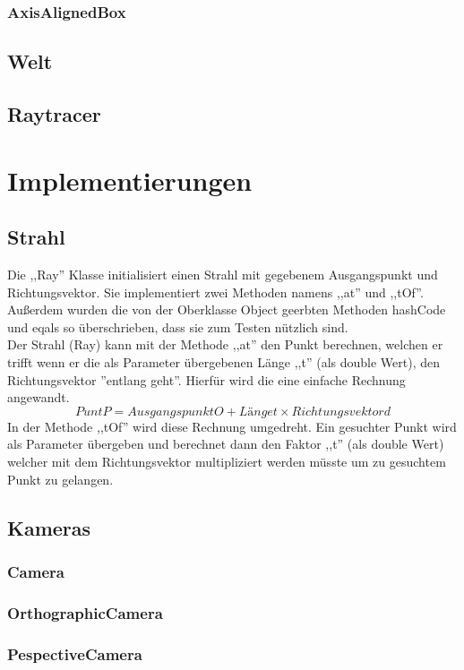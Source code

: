 \documentclass[14pt]{extarticle}
\begin{document}
\subsubsection{AxisAlignedBox}

\subsection{Welt}
\subsection{Raytracer}

\section{Implementierungen}

\subsection{Strahl}
Die ,,Ray'' Klasse initialisiert einen Strahl mit gegebenem Ausgangspunkt und Richtungsvektor. Sie implementiert zwei Methoden namens ,,at'' und ,,tOf''. Außerdem wurden die von der Oberklasse Object geerbten Methoden hashCode und eqals so überschrieben, dass sie zum Testen nützlich sind.\\
Der Strahl (Ray) kann mit der Methode ,,at'' den Punkt berechnen, welchen er trifft wenn er die als Parameter übergebenen Länge ,,t'' (als double Wert), den Richtungsvektor ''entlang geht''. Hierfür wird die eine einfache Rechnung angewandt. 
$$ Punt P = Ausgangspunkt O + Länge t \times Richtungsvektor d $$
In der Methode ,,tOf'' wird diese Rechnung umgedreht. Ein gesuchter Punkt wird als Parameter übergeben und berechnet dann den Faktor ,,t'' (als double Wert) welcher mit dem Richtungsvektor multipliziert werden müsste um zu gesuchtem Punkt zu gelangen. \\
\subsection{Kameras}
\subsubsection{Camera}
\subsubsection{OrthographicCamera}
\subsubsection{PespectiveCamera}
\end{document}

